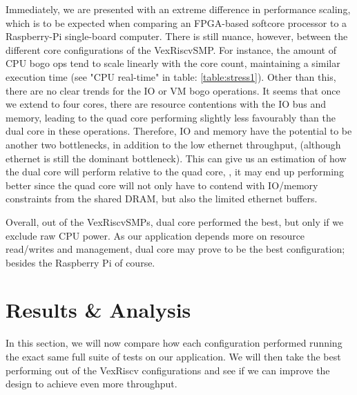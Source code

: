 Immediately, we are presented with an extreme difference in performance scaling, which is to be expected when comparing an FPGA-based softcore processor to a Raspberry-Pi single-board computer. There is still nuance, however, between the different core configurations of the VexRiscvSMP. For instance, the amount of CPU bogo ops tend to scale linearly with the core count, maintaining a similar execution time (see "CPU real-time" in table: \ref{table:stress1}). Other than this, there are no clear trends for the IO or VM bogo operations. It seems that once we extend to four cores, there are resource contentions with the IO bus and memory, leading to the quad core performing slightly less favourably than the dual core in these operations. Therefore, IO and memory have the potential to be another two bottlenecks, in addition to the low ethernet throughput, (although ethernet is still the dominant bottleneck). This can give us an estimation of how the dual core will perform relative to the quad core, \ie, it may end up performing better since the quad core will not only have to contend with IO/memory constraints from the shared DRAM, but also the limited ethernet buffers.

Overall, out of the VexRiscvSMPs, dual core performed the best, but only if we exclude raw CPU power. As our application depends more on resource read/writes and management, dual core may prove to be the best configuration; besides the Raspberry Pi of course.
\raggedbottom

\section{Results \& Analysis}
In this section, we will now compare how each configuration performed running the exact same full suite of tests on our application. We will then take the best performing out of the VexRiscv configurations and see if we can improve the design to achieve even more throughput.

